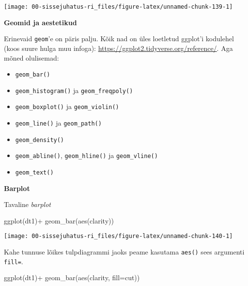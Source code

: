 \documentclass[
]{book}
\newenvironment{Shaded}{\begin{snugshade}}{\end{snugshade}}
\newcommand{\AttributeTok}[1]{\textcolor[rgb]{0.77,0.63,0.00}{#1}}
\newcommand{\FunctionTok}[1]{\textcolor[rgb]{0.00,0.00,0.00}{#1}}
\newcommand{\NormalTok}[1]{#1}
\newcommand{\SpecialCharTok}[1]{\textcolor[rgb]{0.00,0.00,0.00}{#1}}
\providecommand{\tightlist}{%
  \setlength{\itemsep}{0pt}\setlength{\parskip}{0pt}}
\begin{document}
\begin{center}\texttt{[image: 00-sissejuhatus-ri\_files/figure-latex/unnamed-chunk-139-1]} \end{center}

\textbf{Geomid ja aestetikud}

Erinevaid \texttt{geom}'e on päris palju. Kõik nad on üles loetletud ggplot'i kodulehel (koos suure hulga muu infoga): \url{https://ggplot2.tidyverse.org/reference/}. Aga mõned olulisemad:

\begin{itemize}
\tightlist
\item
  \texttt{geom\_bar()}
\item
  \texttt{geom\_histogram()} ja \texttt{geom\_freqpoly()}
\item
  \texttt{geom\_boxplot()} ja \texttt{geom\_violin()}
\item
  \texttt{geom\_line()} ja \texttt{geom\_path()}
\item
  \texttt{geom\_density()}
\item
  \texttt{geom\_abline()}, \texttt{geom\_hline()} ja \texttt{geom\_vline()}
\item
  \texttt{geom\_text()}
\end{itemize}

\textbf{Barplot}

Tavaline \emph{barplot}

\begin{Shaded}
\begin{Highlighting}[]
\FunctionTok{ggplot}\NormalTok{(dt1)}\SpecialCharTok{+}
  \FunctionTok{geom\_bar}\NormalTok{(}\FunctionTok{aes}\NormalTok{(clarity))}
\end{Highlighting}
\end{Shaded}

\begin{center}\texttt{[image: 00-sissejuhatus-ri\_files/figure-latex/unnamed-chunk-140-1]} \end{center}

Kahe tunnuse lõikes tulpdiagrammi jaoks peame kasutama \texttt{aes()} sees argumenti \texttt{fill=}.

\begin{Shaded}
\begin{Highlighting}[]
\FunctionTok{ggplot}\NormalTok{(dt1)}\SpecialCharTok{+}
  \FunctionTok{geom\_bar}\NormalTok{(}\FunctionTok{aes}\NormalTok{(clarity, }\AttributeTok{fill=}\NormalTok{cut))}
\end{Highlighting}
\end{Shaded}
\end{document}
